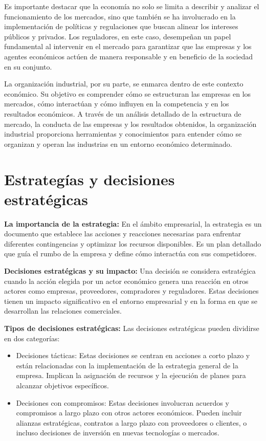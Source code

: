 \documentclass[
  doc,
  floatsintext,
  longtable,
  a4paper,
  nolmodern,
  notxfonts,
  notimes,
  colorlinks=true,linkcolor=blue,citecolor=blue,urlcolor=blue]{apa7}
\begin{document}
Es importante destacar que la economía no solo se limita a describir y
analizar el funcionamiento de los mercados, sino que también se ha
involucrado en la implementación de políticas y regulaciones que buscan
alinear los intereses públicos y privados. Los reguladores, en este
caso, desempeñan un papel fundamental al intervenir en el mercado para
garantizar que las empresas y los agentes económicos actúen de manera
responsable y en beneficio de la sociedad en su conjunto.

La organización industrial, por su parte, se enmarca dentro de este
contexto económico. Su objetivo es comprender cómo se estructuran las
empresas en los mercados, cómo interactúan y cómo influyen en la
competencia y en los resultados económicos. A través de un análisis
detallado de la estructura de mercado, la conducta de las empresas y los
resultados obtenidos, la organización industrial proporciona
herramientas y conocimientos para entender cómo se organizan y operan
las industrias en un entorno económico determinado.

\section{Estrategías y decisiones
estratégicas}\label{estrateguxedas-y-decisiones-estratuxe9gicas}

\textbf{La importancia de la estrategia:} En el ámbito empresarial, la
estrategia es un documento que establece las acciones y reacciones
necesarias para enfrentar diferentes contingencias y optimizar los
recursos disponibles. Es un plan detallado que guía el rumbo de la
empresa y define cómo interactúa con sus competidores.

\textbf{Decisiones estratégicas y su impacto:} Una decisión se considera
estratégica cuando la acción elegida por un actor económico genera una
reacción en otros actores como empresas, proveedores, compradores y
reguladores. Estas decisiones tienen un impacto significativo en el
entorno empresarial y en la forma en que se desarrollan las relaciones
comerciales.

\textbf{Tipos de decisiones estratégicas:} Las decisiones estratégicas
pueden dividirse en dos categorías:

\begin{itemize}
\item
  Decisiones tácticas: Estas decisiones se centran en acciones a corto
  plazo y están relacionadas con la implementación de la estrategia
  general de la empresa. Implican la asignación de recursos y la
  ejecución de planes para alcanzar objetivos específicos.
\item
  Decisiones con compromisos: Estas decisiones involucran acuerdos y
  compromisos a largo plazo con otros actores económicos. Pueden incluir
  alianzas estratégicas, contratos a largo plazo con proveedores o
  clientes, o incluso decisiones de inversión en nuevas tecnologías o
  mercados.
\end{itemize}
\end{document}
